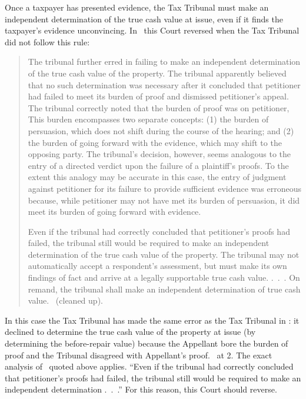 \documentclass[12pt,\documentclassflag]{michiganCourtOfAppealsBrief}
\begin{document}
Once a taxpayer has presented evidence, the Tax Tribunal must make an independent determination of the true cash value at issue, even if it finds the taxpayer's evidence unconvincing. In \cite{Jones & Laughlin}\ this Court reversed when the Tax Tribunal did not follow this rule:

\begin{quotation}
	The tribunal further erred in failing to make an independent determination of the true cash value of the property. The tribunal apparently believed that no such determination was necessary after it concluded that petitioner had failed to meet its burden of proof and dismissed petitioner's appeal. The tribunal correctly noted that the burden of proof was on petitioner, This burden encompasses two separate concepts: (1) the burden of persuasion, which does not shift during the course of the hearing; and (2) the burden of going forward with the evidence, which may shift to the opposing party. The tribunal's decision, however, seems analogous to the entry of a directed verdict upon the failure of a plaintiff's proofs. To the extent this analogy may be accurate in this case, the entry of judgment against petitioner for its failure to provide sufficient evidence was erroneous because, while petitioner may not have met its burden of persuasion, it did meet its burden of going forward with evidence.
	
	Even if the tribunal had correctly concluded that petitioner's proofs had failed, the tribunal still would be required to make an independent determination of the true cash value of the property. The tribunal may not automatically accept a respondent's assessment, but must make its own findings of fact and arrive at a legally supportable true cash value. .~.~. On remand, the tribunal shall make an independent determination of true cash value. \ (cleaned up).
\end{quotation}

In this case the Tax Tribunal has made the same error as the Tax Tribunal in \cite[s]{Jones & Laughlin}: it declined to determine the true cash value of the property at issue (by determining the before-repair value) because the Appellant bore the burden of proof and the Tribunal disagreed with Appellant's proof. \reconsiderationDenied\ at 2. The exact analysis of \cite[s]{Jones & Laughlin}\ quoted above applies. ``Even if the tribunal had correctly concluded that petitioner's proofs had failed, the tribunal still would be required to make an independent determination .~.~.'' For this reason, this Court should reverse.
\end{document}
